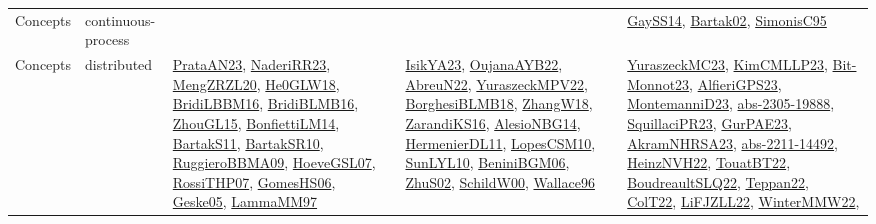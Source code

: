 {\begin{longtable}{lp{3cm}>{\raggedright}p{6cm}>{\raggedright}p{6cm}p{8cm}}
Concepts & continuous-process &  &  & \href{papers/GaySS14.pdf}{GaySS14}\cite{GaySS14}, \href{papers/Bartak02.pdf}{Bartak02}\cite{Bartak02}, \href{papers/SimonisC95.pdf}{SimonisC95}\cite{SimonisC95}\\
Concepts & distributed & \href{articles/PrataAN23.pdf}{PrataAN23}\cite{PrataAN23}, \href{articles/NaderiRR23.pdf}{NaderiRR23}\cite{NaderiRR23}, \href{articles/MengZRZL20.pdf}{MengZRZL20}\cite{MengZRZL20}, \href{papers/He0GLW18.pdf}{He0GLW18}\cite{He0GLW18}, \href{papers/BridiLBBM16.pdf}{BridiLBBM16}\cite{BridiLBBM16}, \href{articles/BridiBLMB16.pdf}{BridiBLMB16}\cite{BridiBLMB16}, \href{papers/ZhouGL15.pdf}{ZhouGL15}\cite{ZhouGL15}, \href{papers/BonfiettiLM14.pdf}{BonfiettiLM14}\cite{BonfiettiLM14}, \href{articles/BartakS11.pdf}{BartakS11}\cite{BartakS11}, \href{articles/BartakSR10.pdf}{BartakSR10}\cite{BartakSR10}, \href{articles/RuggieroBBMA09.pdf}{RuggieroBBMA09}\cite{RuggieroBBMA09}, \href{papers/HoeveGSL07.pdf}{HoeveGSL07}\cite{HoeveGSL07}, \href{papers/RossiTHP07.pdf}{RossiTHP07}\cite{RossiTHP07}, \href{papers/GomesHS06.pdf}{GomesHS06}\cite{GomesHS06}, \href{papers/Geske05.pdf}{Geske05}\cite{Geske05}, \href{articles/LammaMM97.pdf}{LammaMM97}\cite{LammaMM97} & \href{articles/IsikYA23.pdf}{IsikYA23}\cite{IsikYA23}, \href{papers/OujanaAYB22.pdf}{OujanaAYB22}\cite{OujanaAYB22}, \href{articles/AbreuN22.pdf}{AbreuN22}\cite{AbreuN22}, \href{articles/YuraszeckMPV22.pdf}{YuraszeckMPV22}\cite{YuraszeckMPV22}, \href{articles/BorghesiBLMB18.pdf}{BorghesiBLMB18}\cite{BorghesiBLMB18}, \href{articles/ZhangW18.pdf}{ZhangW18}\cite{ZhangW18}, \href{articles/ZarandiKS16.pdf}{ZarandiKS16}\cite{ZarandiKS16}, \href{papers/AlesioNBG14.pdf}{AlesioNBG14}\cite{AlesioNBG14}, \href{papers/HermenierDL11.pdf}{HermenierDL11}\cite{HermenierDL11}, \href{articles/LopesCSM10.pdf}{LopesCSM10}\cite{LopesCSM10}, \href{papers/SunLYL10.pdf}{SunLYL10}\cite{SunLYL10}, \href{papers/BeniniBGM06.pdf}{BeniniBGM06}\cite{BeniniBGM06}, \href{papers/ZhuS02.pdf}{ZhuS02}\cite{ZhuS02}, \href{articles/SchildW00.pdf}{SchildW00}\cite{SchildW00}, \href{articles/Wallace96.pdf}{Wallace96}\cite{Wallace96} & \href{papers/YuraszeckMC23.pdf}{YuraszeckMC23}\cite{YuraszeckMC23}, \href{papers/KimCMLLP23.pdf}{KimCMLLP23}\cite{KimCMLLP23}, \href{papers/Bit-Monnot23.pdf}{Bit-Monnot23}\cite{Bit-Monnot23}, \href{articles/AlfieriGPS23.pdf}{AlfieriGPS23}\cite{AlfieriGPS23}, \href{articles/MontemanniD23.pdf}{MontemanniD23}\cite{MontemanniD23}, \href{articles/abs-2305-19888.pdf}{abs-2305-19888}\cite{abs-2305-19888}, \href{papers/SquillaciPR23.pdf}{SquillaciPR23}\cite{SquillaciPR23}, \href{articles/GurPAE23.pdf}{GurPAE23}\cite{GurPAE23}, \href{articles/AkramNHRSA23.pdf}{AkramNHRSA23}\cite{AkramNHRSA23}, \href{articles/abs-2211-14492.pdf}{abs-2211-14492}\cite{abs-2211-14492}, \href{articles/HeinzNVH22.pdf}{HeinzNVH22}\cite{HeinzNVH22}, \href{papers/TouatBT22.pdf}{TouatBT22}\cite{TouatBT22}, \href{papers/BoudreaultSLQ22.pdf}{BoudreaultSLQ22}\cite{BoudreaultSLQ22}, \href{papers/Teppan22.pdf}{Teppan22}\cite{Teppan22}, \href{articles/ColT22.pdf}{ColT22}\cite{ColT22}, \href{papers/LiFJZLL22.pdf}{LiFJZLL22}\cite{LiFJZLL22}, \href{papers/WinterMMW22.pdf}{WinterMMW22}\cite{WinterMMW22}, 
\end{longtable}}
